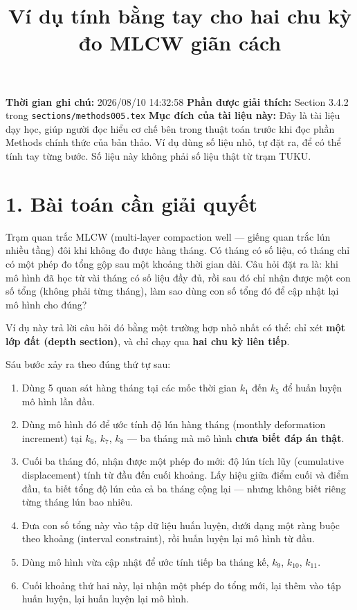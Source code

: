 \documentclass[12pt]{article}
\begin{document}
\title{Ví dụ tính bằng tay cho hai chu kỳ đo MLCW giãn cách}
\date{}
\maketitle

\textbf{Thời gian ghi chú:} 2026/08/10 14:32:58
\textbf{Phần được giải thích:} Section 3.4.2 trong \texttt{sections/methods005.tex}
\textbf{Mục đích của tài liệu này:} Đây là tài liệu dạy học, giúp người đọc hiểu cơ chế bên trong thuật toán trước khi đọc phần Methods chính thức của bản thảo. Ví dụ dùng số liệu nhỏ, tự đặt ra, để có thể tính tay từng bước. Số liệu này không phải số liệu thật từ trạm TUKU.

\section{1. Bài toán cần giải quyết}

Trạm quan trắc MLCW (multi-layer compaction well — giếng quan trắc lún nhiều tầng) đôi khi không đo được hàng tháng. Có tháng có số liệu, có tháng chỉ có một phép đo tổng gộp sau một khoảng thời gian dài. Câu hỏi đặt ra là: khi mô hình đã học từ vài tháng có số liệu đầy đủ, rồi sau đó chỉ nhận được một con số tổng (không phải từng tháng), làm sao dùng con số tổng đó để cập nhật lại mô hình cho đúng?

Ví dụ này trả lời câu hỏi đó bằng một trường hợp nhỏ nhất có thể: chỉ xét \textbf{một lớp đất (depth section)}, và chỉ chạy qua \textbf{hai chu kỳ liên tiếp}.

Sáu bước xảy ra theo đúng thứ tự sau:

\begin{enumerate}
\item Dùng 5 quan sát hàng tháng tại các mốc thời gian $k_1$ đến $k_5$ để huấn luyện mô hình lần đầu.
\item Dùng mô hình đó để ước tính độ lún hàng tháng (monthly deformation increment) tại $k_6$, $k_7$, $k_8$ — ba tháng mà mô hình \textbf{chưa biết đáp án thật}.
\item Cuối ba tháng đó, nhận được một phép đo mới: độ lún tích lũy (cumulative displacement) tính từ đầu đến cuối khoảng. Lấy hiệu giữa điểm cuối và điểm đầu, ta biết tổng độ lún của cả ba tháng cộng lại — nhưng không biết riêng từng tháng lún bao nhiêu.
\item Đưa con số tổng này vào tập dữ liệu huấn luyện, dưới dạng một ràng buộc theo khoảng (interval constraint), rồi huấn luyện lại mô hình từ đầu.
\item Dùng mô hình vừa cập nhật để ước tính tiếp ba tháng kế, $k_9$, $k_{10}$, $k_{11}$.
\item Cuối khoảng thứ hai này, lại nhận một phép đo tổng mới, lại thêm vào tập huấn luyện, lại huấn luyện lại mô hình.
\end{enumerate}
\end{document}
